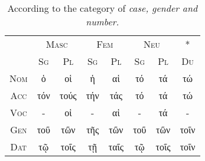 \documentclass[10pt]{memoir}
\newcommand{\tsc}[1]{\textsc{#1}}
\newcommand{\grc}[1]{\fontspec{Inter}#1}
\begin{document}
    \nopagebreak
    \begin{table}[H]
        \begin{tabular}{c|ccccccc}
            \multicolumn{1}{l}{} & \multicolumn{2}{c}{\tsc{Masc}} & \multicolumn{2}{c}{\tsc{Fem}} & \multicolumn{2}{c}{\tsc{Neu}} & *                        \\
            \multicolumn{1}{l}{} & \tsc{Sg}         & \tsc{Pl}          & \tsc{Sg}         & \tsc{Pl}         & \tsc{Sg}         & \tsc{Pl}         & \tsc{Du}                       \\
            \hline
            \tsc{Nom}           & \grc{ὁ}          & \grc{οἱ}           & \grc{ἡ}          & \grc{αἱ}          & \grc{τό}          & \grc{τά}          & \grc{τώ}                       \\
            \tsc{Acc}           & \grc{τόν}        & \grc{τούς}         & \grc{τήν}        & \grc{τάς}         & \grc{τό}          & \grc{τά}          & \grc{τώ}                        \\
            \tsc{Voc}           & -                & \grc{οἱ}           & -                & \grc{αἱ}          & -                 & \grc{τά}          & -                        \\
            \tsc{Gen}           & \grc{τοῦ}        & \grc{τῶν}          & \grc{τῆς}        & \grc{τῶν}         & \grc{τοῦ}         & \grc{τῶν}         & \grc{τοῖν}                     \\
            \tsc{Dat}           & \grc{τῷ}         & \grc{τοῖς}         & \grc{τῇ}         & \grc{ταῖς}        & \grc{τῷ}          & \grc{τοῖς}        & \multicolumn{1}{l}{\grc{τοῖν}}
        \end{tabular}
        \caption{According to the category of \em case, \em gender and \em number.}
    \end{table}
\end{document}
